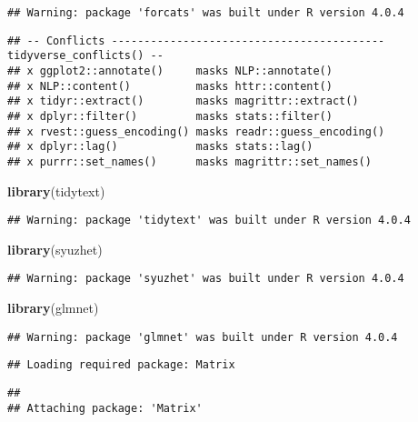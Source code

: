 \documentclass[
]{article}
\newenvironment{Shaded}{\begin{snugshade}}{\end{snugshade}}
\newcommand{\KeywordTok}[1]{\textcolor[rgb]{0.13,0.29,0.53}{\textbf{#1}}}
\newcommand{\NormalTok}[1]{#1}
\begin{document}
\begin{verbatim}
## Warning: package 'forcats' was built under R version 4.0.4
\end{verbatim}

\begin{verbatim}
## -- Conflicts ------------------------------------------ tidyverse_conflicts() --
## x ggplot2::annotate()     masks NLP::annotate()
## x NLP::content()          masks httr::content()
## x tidyr::extract()        masks magrittr::extract()
## x dplyr::filter()         masks stats::filter()
## x rvest::guess_encoding() masks readr::guess_encoding()
## x dplyr::lag()            masks stats::lag()
## x purrr::set_names()      masks magrittr::set_names()
\end{verbatim}

\begin{Shaded}
\begin{Highlighting}[]
\KeywordTok{library}\NormalTok{(tidytext)}
\end{Highlighting}
\end{Shaded}

\begin{verbatim}
## Warning: package 'tidytext' was built under R version 4.0.4
\end{verbatim}

\begin{Shaded}
\begin{Highlighting}[]
\KeywordTok{library}\NormalTok{(syuzhet)}
\end{Highlighting}
\end{Shaded}

\begin{verbatim}
## Warning: package 'syuzhet' was built under R version 4.0.4
\end{verbatim}

\begin{Shaded}
\begin{Highlighting}[]
\KeywordTok{library}\NormalTok{(glmnet)}
\end{Highlighting}
\end{Shaded}

\begin{verbatim}
## Warning: package 'glmnet' was built under R version 4.0.4
\end{verbatim}

\begin{verbatim}
## Loading required package: Matrix
\end{verbatim}

\begin{verbatim}
## 
## Attaching package: 'Matrix'
\end{verbatim}
\end{document}
